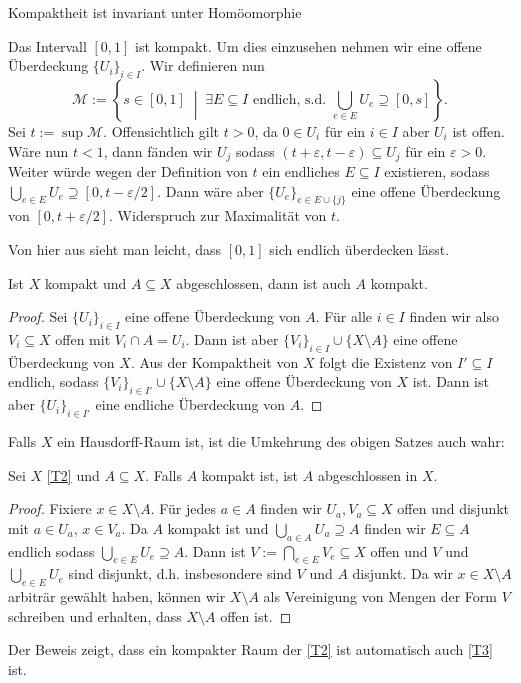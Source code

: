 \documentclass[
12pt, 
openany, 
a4paper, 
final,
fleqn, 
]{myclass}
\numberwithin{equation}{chapter}
\numberwithin{section}{chapter}
\newcommand{\union}{\bigcup}
\newcommand{\intersect}{\bigcap}
\newcommand{\set}[2]{\left\{#1\;\middle|\;#2\right\}}
\newcommand{\todo}[1]{}
\begin{document}
\begin{rmk}\label{4.2}
Kompaktheit ist invariant unter Homöomorphie
\end{rmk}

\begin{eg}\label{4.3}
Das Intervall $[0,1]$ ist kompakt. Um dies einzusehen nehmen wir eine offene Überdeckung $ \{U_{i}\}_{i\in I} $. Wir definieren nun 
\[ 
\mathcal{M} := \set{s\in [0,1]}{\exists E \subseteq I \text{ endlich, s.d. }\union_{e\in E}U_{e}\supseteq [0,s]}.
\]
Sei $t:= \sup\mathcal{M}$. Offensichtlich gilt $t>0$, da $0\in U_i$ für ein $i\in I$ aber $U_i$ ist offen. Wäre nun $t<1$, dann fänden wir $U_j$ sodass $(t+\varepsilon, t-\varepsilon) \subseteq U_j$ für ein $\varepsilon>0$. Weiter würde wegen der Definition von $t$ ein endliches $E\subseteq I$ existieren, sodass $\union_{e\in E}U_{e}\supseteq [0, t- \varepsilon/2]$. Dann wäre aber $ \{U_{e}\}_{e\in E\cup\{j\}} $ eine offene Überdeckung von $[0, t+\varepsilon/2]$. Widerspruch zur Maximalität von $t$. 

Von hier aus sieht man leicht, dass $[0,1]$ sich endlich überdecken lässt. 
\end{eg}

\begin{thr}\label{4.4}
Ist $X$ kompakt und $A\subseteq X$ abgeschlossen, dann ist auch $A$ kompakt. 
\end{thr}
\begin{proof}
Sei $ \{U_{i}\}_{i\in I} $ eine offene Überdeckung von $A$. Für alle $i\in I$ finden wir also $V_i\subseteq X$ offen mit $V_i \cap A = U_i$. Dann ist aber $ \{V_{i}\}_{i\in I}\cup\{X\setminus A\} $ eine offene Überdeckung von $X$. Aus der Kompaktheit von $X$ folgt die Existenz von $I'\subseteq I$ endlich, sodass $ \{V_{i}\}_{i\in I'}\cup\{X\setminus A\} $ eine offene Überdeckung von $X$ ist. Dann ist aber $ \{U_{i}\}_{i\in I'} $ eine endliche Überdeckung von $A$. 
\end{proof}
Falls $X$ ein Hausdorff-Raum ist, ist die Umkehrung des obigen Satzes auch wahr: 
\begin{thr}\label{4.5}
Sei $X$ \ref{T2} und $A\subseteq X$. Falls $A$ kompakt ist, ist $A$ abgeschlossen in $X$. 
\end{thr}

\begin{proof}
Fixiere $x\in X\setminus A$. Für jedes $a\in A$ finden wir $U_{a}, V_{a}\subseteq X$ offen und disjunkt mit $ a\in U_{a} $, $ x\in V_{a} $. Da $A$ kompakt ist und $ \union_{a\in A}U_{a}\supseteq A $ finden wir $E\subseteq A$ endlich sodass $ \union_{e\in E}U_{e} \supseteq A $. Dann ist $ V := \intersect_{e\in E}V_{e} \subseteq X$ offen und $V$ und $\union_{e\in E}U_{e}$ sind disjunkt, d.h. insbesondere sind $ V $ und $ A $ disjunkt. Da wir $x\in X\setminus A$ arbiträr gewählt haben, können wir $X\setminus A$ als Vereinigung von Mengen der Form $V$ schreiben und erhalten, dass $X\setminus A$ offen ist. \todo{Schreibe den Beweis schöner auf}
\end{proof}
\begin{rmk}\label{4.6}
Der Beweis zeigt, dass ein kompakter Raum der \ref{T2} ist automatisch auch \ref{T3} ist. 
\end{rmk}
\end{document}
